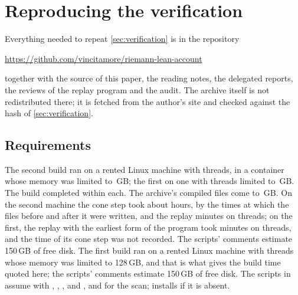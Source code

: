 \section{Reproducing the verification}\label{app:reproduce}

Everything needed to repeat \cref{sec:verification} is in the repository
\begin{center}
\url{https://github.com/vincitamore/riemann-lean-account}
\end{center}
together with the source of this paper, the reading notes, the delegated reports, the reviews
of the replay program and the audit. The archive itself is not redistributed there; it is
fetched from the author's site and checked against the hash of \cref{sec:verification}.

\subsection*{Requirements}
\ifsecondrun
The second build ran on a rented Linux machine with \buildthreads{} threads, in a container
whose memory was limited to \memorylimit\,GB; the first on one with \firstbuildthreads{}
threads limited to \firstmemorylimit\,GB. The build completed within each. The archive's
compiled files come to \compiledgb\,GB. On the second machine the cone step took about
\cuthours{} hours, by the times at which the files before and after it were written, and
the replay \replayminutes{} minutes on \replaythreads{} threads; on the first, the replay
with the earliest form of the program took \firstreplayminutes{} minutes on
\firstreplaythreads{} threads, and the time of its cone step was not recorded. The scripts'
comments estimate 150\,GB of free disk.
\else
The first build ran on a rented Linux machine with \buildthreads{} threads whose memory was
limited to 128\,GB, and that is what gives the build time quoted here; the scripts' comments
estimate 150\,GB of free disk.
\fi
The scripts in  assume  with ,
, ,  and , and  for the scan;
 installs  if it is absent.

